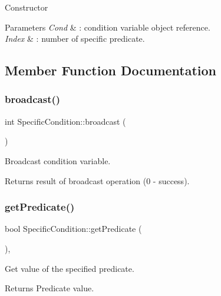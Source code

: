 Constructor 
\begin{DoxyParams}{Parameters}
{\em Cond} & \+: condition variable object reference. \\
\hline
{\em Index} & \+: number of specific predicate. \\
\hline
\end{DoxyParams}


\subsection{Member Function Documentation}
\mbox{\label{classSpecificCondition_a74ec8602bf6bc6de21faee0fb6910c2d}} 
\subsubsection{\texorpdfstring{broadcast()}{broadcast()}}
{\footnotesize\ttfamily int Specific\+Condition\+::broadcast (\begin{DoxyParamCaption}{ }\end{DoxyParamCaption})\hspace{0.3cm}{\ttfamily [inline]}}

Broadcast condition variable. \begin{DoxyReturn}{Returns}
result of broadcast operation (0 -\/ success). 
\end{DoxyReturn}
\mbox{\label{classSpecificCondition_a136588886dab164bdb5ef1cbca9bd222}} 
\subsubsection{\texorpdfstring{get\+Predicate()}{getPredicate()}}
{\footnotesize\ttfamily bool Specific\+Condition\+::get\+Predicate (\begin{DoxyParamCaption}{ }\end{DoxyParamCaption})\hspace{0.3cm}{\ttfamily [inline]}, {\ttfamily [noexcept]}}

Get value of the specified predicate. \begin{DoxyReturn}{Returns}
Predicate value. 
\end{DoxyReturn}

